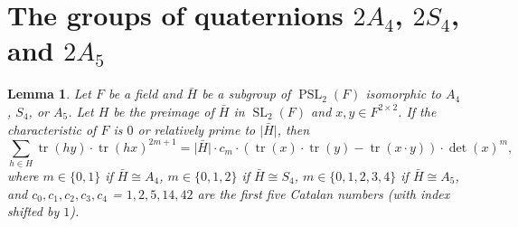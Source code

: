 \documentclass[12pt]{amsart}
\theoremstyle{plain}
\newtheorem{lemma}[theorem]{Lemma}
\theoremstyle{definition}
\numberwithin{equation}{section}
\newcommand{\abs}[1]{\lvert#1\rvert}
\newcommand*{\set}[1]{\{#1\}}
\newcommand{\bH}{\bar{H}}
\DeclareMathOperator{\PSL}{PSL}
\DeclareMathOperator{\SL}{SL}
\DeclareMathOperator{\trace}{tr}
\begin{document}
\section{The groups of quaternions $2A_4$, $2S_4$, and $2A_5$}
\begin{lemma}
  Let $F$ be a field and $\bH$ be a subgroup of $\PSL_2(F)$ isomorphic
  to $A_4$, $S_4$, or $A_5$. Let $H$ be the preimage of $\bH$ in
  $\SL_2(F)$ and $x, y\in F^{2\times 2}$. If the characteristic of $F$
  is $0$ or relatively prime to $\abs{\bH}$, then
  \[
    \sum_{h\in H}\trace(hy)\cdot\trace(hx)^{2m+1}%
    =\abs{\bH}\cdot c_m\cdot%
    (\trace(x)\cdot\trace(y)-\trace(x\cdot y))\cdot\det(x)^m,
  \]
  where $m\in\set{0, 1}$ if $\bH\cong A_4$, $m\in\set{0, 1, 2}$ if
  $\bH\cong S_4$, $m\in\set{0, 1, 2, 3, 4}$ if $\bH\cong A_5$, and
  $c_0, c_1, c_2, c_3, c_4$ = $1, 2, 5, 14, 42$ are the first five
  Catalan numbers (with index shifted by $1$).
\end{lemma}
\end{document}
